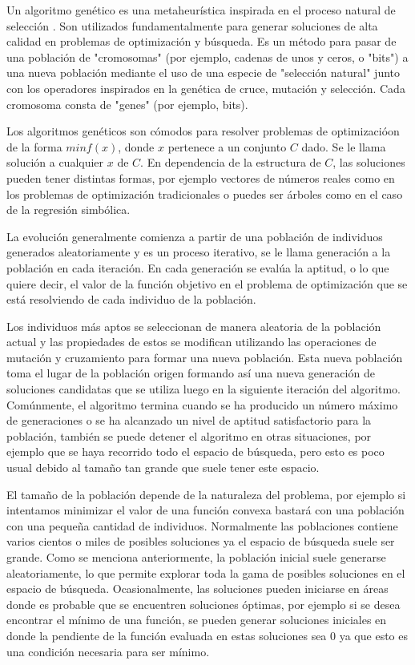 Un algoritmo genético es una metaheurística inspirada en el proceso natural de selección \cite{mitchell1998introduction}. Son utilizados fundamentalmente para generar soluciones de alta calidad en problemas de optimización y búsqueda. Es un método para pasar de una población de "cromosomas" (por ejemplo, cadenas de unos y ceros, o "bits") a una nueva población mediante el uso de una especie de "selección natural" junto con los operadores inspirados en la genética de cruce, mutación y selección. Cada cromosoma consta de "genes" (por ejemplo, bits).

Los algoritmos genéticos son cómodos para resolver problemas de optimizacióon de la forma $min f(x)$, donde $x$ pertenece a un conjunto $C$ dado. Se le llama solución a cualquier $x$ de $C$. En dependencia de la estructura de $C$, las soluciones pueden tener distintas formas, por ejemplo vectores de números reales como en los problemas de optimización tradicionales o puedes ser árboles como en el caso de la regresión simbólica.

La evolución generalmente comienza a partir de una población de individuos generados aleatoriamente y es un proceso iterativo, se le llama generación a la población en cada iteración. En cada generación se evalúa la aptitud, o lo que quiere decir, el valor de la función objetivo en el problema de optimización que se está resolviendo de cada individuo de la población.

Los individuos más aptos se seleccionan de manera aleatoria de la población actual y las propiedades de estos se modifican utilizando las operaciones de mutación y cruzamiento para formar una nueva población. Esta nueva población toma el lugar de la población origen formando así una nueva generación de soluciones candidatas que se utiliza luego en la siguiente iteración del algoritmo. Comúnmente, el algoritmo termina cuando se ha producido un número máximo de generaciones o se ha alcanzado un nivel de aptitud satisfactorio para la población, también se puede detener el algoritmo en otras situaciones, por ejemplo que se haya recorrido todo el espacio de búsqueda, pero esto es poco usual debido al tamaño tan grande que suele tener este espacio.

El tamaño de la población depende de la naturaleza del problema, por ejemplo si intentamos minimizar el valor de una función convexa bastará con una población con una pequeña cantidad de individuos. Normalmente las poblaciones contiene varios cientos o miles de posibles soluciones ya el espacio de búsqueda suele ser grande. Como se menciona anteriormente, la población inicial suele generarse aleatoriamente, lo que permite explorar toda la gama de posibles soluciones en el espacio de búsqueda. Ocasionalmente, las soluciones pueden iniciarse en áreas donde es probable que se encuentren soluciones óptimas, por ejemplo si se desea encontrar el mínimo de una función, se pueden generar soluciones iniciales en donde la pendiente de la función evaluada en estas soluciones sea $0$ ya que esto es una condición necesaria para ser mínimo.

